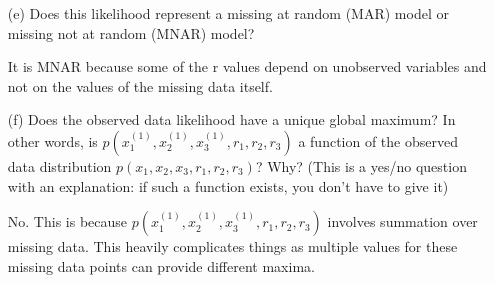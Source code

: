 \documentclass[11pt]{article}
\begin{document}
\begin{enumerate}
\begin{answertext}{6.7cm}{}
    
\end{answertext}


\item[(e)] Does this likelihood represent a missing at random (MAR) model or missing not at random (MNAR) model?

\begin{answertext}{1.5cm}{}

It is MNAR because some of the r values depend on unobserved variables and not on the values of the missing data itself.
    
\end{answertext}


\item[(f)] Does the observed data likelihood have a unique global maximum?  In other words, 
 is $p(x_1^{(1)}, x_2^{(1)}, x_3^{(1)}, r_1, r_2, r_3)$ a function of the observed data distribution $p(x_1, x_2, x_3, r_1, r_2, r_3)$?  Why?  (This is a yes/no question with an explanation: if such a function exists, you don't have to give it)
 
\begin{answertext}{2cm}{}

No. This is because $p(x_1^{(1)}, x_2^{(1)}, x_3^{(1)}, r_1, r_2, r_3)$ involves summation over missing data. This heavily complicates things as multiple values for these missing data points can provide different maxima.
    
\end{answertext}
\end{enumerate}


\pagebreak
\end{document}
